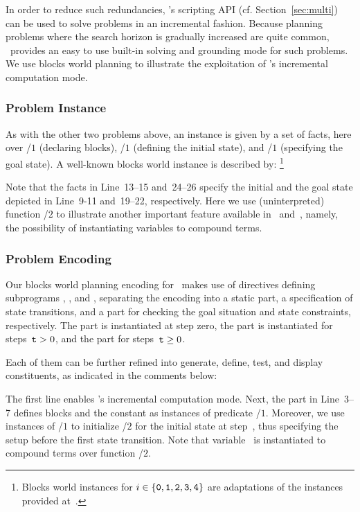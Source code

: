 In order to reduce such redundancies,
\clingo's scripting API (cf. Section~\ref{sec:multi}) can be used to solve problems in an incremental fashion.
Because planning problems where the search horizon is gradually increased are quite common,
\clingo\ provides an easy to use built-in solving and grounding mode for such problems.
We use blocks world planning to illustrate the exploitation of
\clingo's incremental computation mode.

\subsubsection{Problem Instance}\label{subsec:block:instance}

As with the other two problems above,
an instance is given by a set of facts,
here over
/$1$ (declaring blocks),
/$1$ (defining the initial state), and
/$1$ (specifying the goal state).
A well-known blocks world instance is described by:%
\footnote{%
  Blocks world instances  for $i\in\{\texttt{0},\texttt{1},\texttt{2},\texttt{3},\texttt{4}\}$
  are adaptations of the instances provided at~\cite{erdemBW}.}
%

%
Note that the facts in Line~13--15 and~24--26 specify the initial
and the goal state depicted in Line~9-11 and~19--22, respectively.
Here we use (uninterpreted) function /$2$ to illustrate another
important feature available in \gringo\ and~\clingo, namely,
the possibility of instantiating variables to compound terms.


\subsubsection{Problem Encoding}\label{subsec:block:encoding}

Our blocks world planning encoding for \clingo\ makes use of  directives
defining subprograms , , and ,
separating the encoding into 
a static part, 
a specification of state transitions, 
and a part for checking the goal situation and state constraints, respectively.
The  part is instantiated at step zero,
the  part is instantiated for steps~$\texttt{t}>0$,
and the  part for steps~$\texttt{t}\geq0$.

Each of them can be further refined into generate, define, test, and display constituents, 
as indicated in the comments below:
%

%
The first line enables \clingo's incremental computation mode.
%
Next, the  part in Line~3--7 defines blocks and the constant  as instances of predicate /$1$.
Moreover, we use instances of /$1$ to initialize /$2$ for the initial state at step~, thus
specifying the setup before the first state transition.
Note that variable~ is instantiated to compound terms
over function /$2$.

